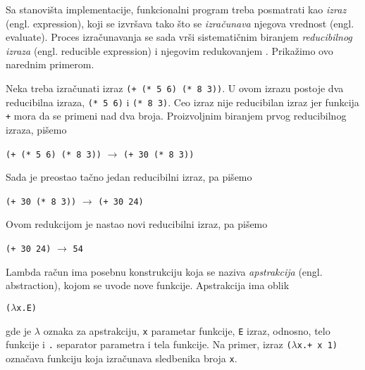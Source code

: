 Sa stanovišta implementacije, funkcionalni program treba posmatrati kao \textit{izraz} (engl. expression), koji se izvršava tako što se \textit{izračunava} njegova vrednost (engl. evaluate). Proces izračunavanja se sada vrši sistematičnim biranjem \textit{reducibilnog izraza} (engl. reducible expression) i njegovim redukovanjem \cite{the-implementation-of-functional-programming-languages}. Prikažimo ovo narednim primerom.

\begin{primer}
	Neka treba izračunati izraz \verb|(+ (* 5 6) (* 8 3))|. U ovom izrazu postoje dva reducibilna izraza, \verb|(* 5 6)| i \verb|(* 8 3)|. Ceo izraz nije reducibilan izraz jer funkcija \verb|+| mora da se primeni nad dva broja. Proizvoljnim biranjem prvog reducibilnog izraza, pišemo
	\begin{center}
		\verb|(+ (* 5 6) (* 8 3))| $\rightarrow$ \verb|(+ 30 (* 8 3))|
	\end{center}
	Sada je preostao tačno jedan reducibilni izraz, pa pišemo
	\begin{center}
		\verb|(+ 30 (* 8 3))| $\rightarrow$ \verb|(+ 30 24)|
	\end{center}
	Ovom redukcijom je nastao novi reducibilni izraz, pa pišemo
	\begin{center}
		\verb|(+ 30 24)| $\rightarrow$ \verb|54|
	\end{center}
\end{primer}

Lambda račun ima posebnu konstrukciju koja se naziva \textit{apstrakcija} (engl. abstraction), kojom se uvode nove funkcije. Apstrakcija ima oblik
\begin{center}
	\verb|(|$\lambda$\verb|x.E)|
\end{center} 
gde je $\lambda$ oznaka za apstrakciju, \verb|x| parametar funkcije, \verb|E| izraz, odnosno, telo funkcije i \verb|.| separator parametra i tela funkcije. Na primer, izraz \verb|(|$\lambda$\verb|x.+ x 1)| označava funkciju koja izračunava sledbenika broja \verb|x|.

